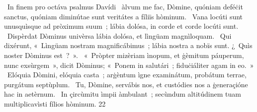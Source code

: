 {~In finem pro octáva psalmus Davídi}
{%
~àlvum me fac, Dòmine, quóniam deféċit sanctus, quóniam diminútae sunt veritátes a fíliïs hòminum.
~Vana locúti sunt unusquìsque ad pròximum suum~; lábia dolósa, in corde et corde locúti sunt.
~Dispèrdat Dòminus univèrsa lábia dolósa, et lìngüam magnìloquam.
~Qui dixérunt, «~Lìngüam nostram magnificábimus~; lábia nostra a nobïs sunt. ¿~Quìs noster Dòminus est~?~».
~«~Pròpter mizèriam ìnopum, et ġèmitum páuperum, nunc exsùrgem~», dicit Dòminus; «~Ponem in salutári~; fiduċiáliter agam in eo.~»
~Elóquia Dòmini, elóquia casta~; arġèntum ìgne examinátum, probátum terrae, purgátum septùplum.
~Tu, Dòmine, servábis nos, et custódies nos a ġeneraçióne hac in aetèrnum.
~In çircùmitu ìmpii àmbulant~; secùndum altitúdinem tuam multiplicavìsti fílios hòminum.}
{2}{2}

